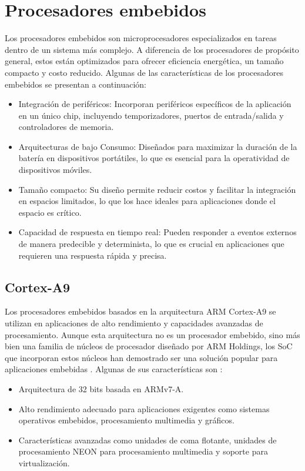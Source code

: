 \section{Procesadores embebidos}

Los procesadores embebidos son microprocesadores especializados en tareas dentro de un sistema más complejo. A diferencia de los procesadores de propósito general, estos están 
optimizados para ofrecer eficiencia energética, un tamaño compacto y costo reducido. Algunas de las características de los procesadores embebidos se presentan a continuación:

\begin{itemize}
    \item Integración de periféricos: Incorporan periféricos específicos de la aplicación en un único chip, incluyendo temporizadores, puertos de entrada/salida y controladores 
    de memoria.
    \item Arquitecturas de bajo Consumo: Diseñados para maximizar la duración de la batería en dispositivos portátiles, lo que es esencial para la operatividad de dispositivos 
    móviles.
    \item Tamaño compacto: Su diseño permite reducir costos y facilitar la integración en espacios limitados, lo que los hace ideales para aplicaciones donde el espacio es 
    crítico.
    \item Capacidad de respuesta en tiempo real: Pueden responder a eventos externos de manera predecible y determinista, lo que es crucial en aplicaciones que requieren una respuesta rápida y precisa.
\end{itemize}

\subsection{Cortex-A9}

Los procesadores embebidos basados en la arquitectura ARM Cortex-A9 se utilizan en aplicaciones de alto rendimiento y capacidades avanzadas de procesamiento.
Aunque esta arquitectura no es un procesador embebido, sino más bien una familia de núcleos de procesador diseñado por ARM Holdings, los SoC que incorporan
estos núcleos han demostrado ser una solución popular para aplicaciones embebidas \cite{Schwiegelshohn2014DesignOA}. Algunas de sus características son : 

\begin{itemize}
    \item Arquitectura de 32 bits basada en ARMv7-A.
    \item Alto rendimiento adecuado para aplicaciones exigentes como sistemas operativos embebidos, procesamiento multimedia y gráficos.
    \item Características avanzadas como unidades de coma flotante, unidades de procesamiento NEON para procesamiento multimedia y soporte para virtualización.
\end{itemize}

